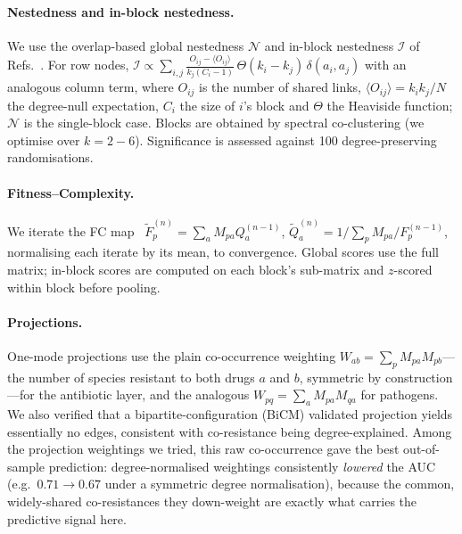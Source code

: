 \documentclass[11pt]{article}
\newcommand{\I}{\mathcal{I}}
\newcommand{\N}{\mathcal{N}}
\begin{document}
\paragraph{Nestedness and in-block nestedness.} We use the overlap-based global nestedness $\N$ and
in-block nestedness $\I$ of Refs.~\cite{soleribalta2018,laudati2023}. For row nodes,
$\I \propto \sum_{i,j}\frac{O_{ij}-\langle O_{ij}\rangle}{k_j(C_i-1)}\,\Theta(k_i-k_j)\,\delta(a_i,a_j)$
with an analogous column term, where $O_{ij}$ is the number of shared links,
$\langle O_{ij}\rangle=k_ik_j/N$ the degree-null expectation, $C_i$ the size of $i$'s block and
$\Theta$ the Heaviside function; $\N$ is the single-block case. Blocks are obtained by spectral
co-clustering (we optimise over $k=2\!-\!6$). Significance is assessed against \num{100}
degree-preserving randomisations.

\paragraph{Fitness--Complexity.} We iterate the FC map~\cite{tacchella2012}
$\tilde F_p^{(n)}=\sum_a M_{pa} Q_a^{(n-1)}$, $\tilde Q_a^{(n)}=1/\sum_p M_{pa}/F_p^{(n-1)}$,
normalising each iterate by its mean, to convergence. Global scores use the full matrix; in-block
scores are computed on each block's sub-matrix and $z$-scored within block before pooling.

\paragraph{Projections.} One-mode projections use the plain co-occurrence weighting
$W_{ab}=\sum_p M_{pa}M_{pb}$---the number of species resistant to both drugs $a$ and $b$, symmetric by
construction---for the antibiotic layer, and the analogous $W_{pq}=\sum_a M_{pa}M_{qa}$ for pathogens.
We also verified that a bipartite-configuration (BiCM) validated projection yields essentially no edges,
consistent with co-resistance being degree-explained. Among the projection weightings we tried, this
raw co-occurrence gave the best out-of-sample prediction: degree-normalised weightings consistently
\emph{lowered} the AUC (e.g.\ $0.71\to0.67$ under a symmetric degree normalisation), because the common,
widely-shared co-resistances they down-weight are exactly what carries the predictive signal here.
\end{document}
